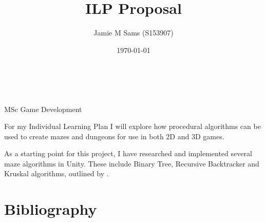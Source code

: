 \documentclass[a4paper, 12pt]{article}
\title{ILP Proposal}
\author{Jamie M Sams (S153907)}
\date{\today}
\begin{document}

\begin{titlepage}
	\vspace*{\fill}
	\centering
	{\huge \thetitle}\\[.5cm]
	{\large \theauthor}\\[.5cm]
	{MSc Game Development}
	\vspace*{\fill}
\end{titlepage}

\lhead{\theauthor}

For my Individual Learning Plan I will explore how procedural algorithms can be used to create mazes and dungeons for use in both 2D and 3D games.

As a starting point for this project, I have researched and implemented several maze algorithms in Unity.  These include Binary Tree, Recursive Backtracker and Kruskal algorithms, outlined by \cite{Buck2010}.

\section{Bibliography}

\printbibliography[heading=none]
\end{document}
